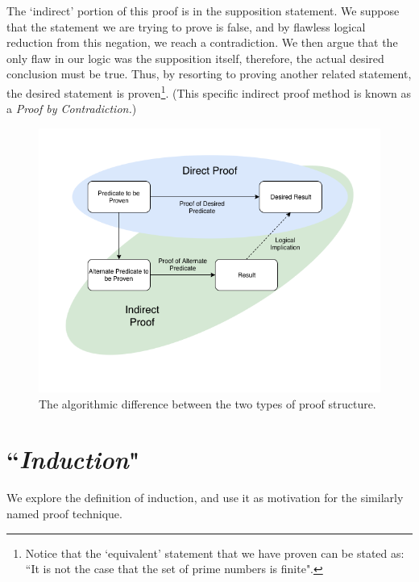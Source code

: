 \documentclass[10pt,a4paper,fleqn]{article}
\begin{document}
	The `indirect' portion of this proof is in the supposition statement. We suppose that the statement we are trying to prove is false, and by flawless logical reduction from this negation, we reach a contradiction. We then argue that the only flaw in our logic was the supposition itself, therefore, the actual desired conclusion must be true. Thus, by resorting to proving another related statement, the desired statement is proven\footnote{Notice that the `equivalent' statement that we have proven can be stated as: ``It is not the case that the set of prime numbers is finite".}. (This specific indirect proof method is known as a \emph{Proof by Contradiction.})
	
	\begin{figure}[h]
		\centering
		\includegraphics[scale=0.45]{res/direct_indirect.png}
		\caption{The algorithmic difference between the two types of proof structure.}
	\end{figure}	
	
	\newpage
	
	\section{``\emph{Induction}"}
	We explore the definition of induction, and use it as motivation for the similarly named proof technique.
	
	
\end{document}
